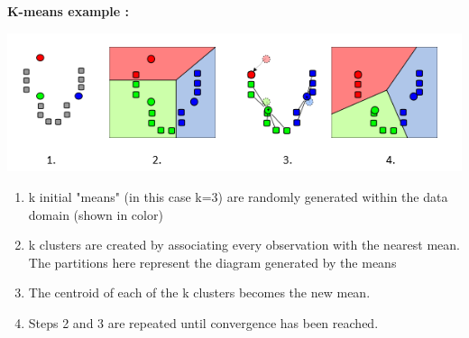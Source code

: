 \documentclass[a4paper,12pt]{article}
\begin{document}
{			\newpage
			\textbf{K-means example : }
			
			\includegraphics{kmeanseg.png}
	
			\begin{enumerate}
				\item	k initial "means" (in this case k=3) are randomly generated within the data domain (shown in color)
				\item	k clusters are created by associating every observation with the nearest mean. The partitions here represent the diagram generated by the means 
				\item	The centroid of each of the k clusters becomes the new mean.
				\item	Steps 2 and 3 are repeated until convergence has been reached.
				
			\end{enumerate}
			
}
\end{document}
